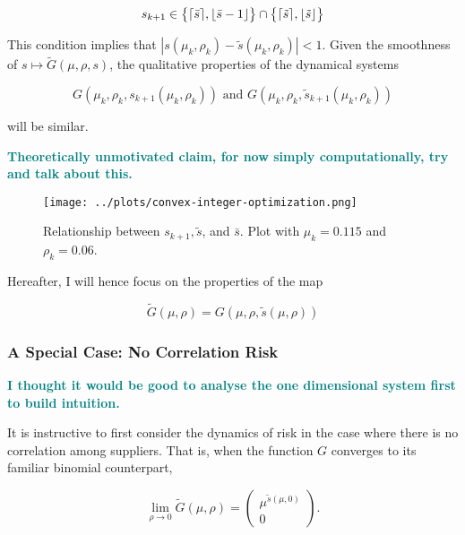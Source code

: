 \documentclass[american, abstract=on]{scrartcl}
\theoremstyle{plain}
\newcommand{\abs}[1]{\left\lvert#1\right\rvert}
\DeclarePairedDelimiter\ceil{\lceil}{\rceil}
\DeclarePairedDelimiter\floor{\lfloor}{\rfloor}
\newcommand\notes[1]{\textcolor{teal}{\footnotesize \textbf{#1}}}
\begin{document}
\begin{equation}
  s_{k + 1} \in \big\{ \ceil{\bar{s}}, \floor{\bar{s} - 1} \big\} \cap \big\{ \ceil{\tilde{s}}, \floor{\tilde{s}} \big\}
\end{equation}

This condition implies that $\abs{s(\mu_k, \rho_k) - \tilde{s}(\mu_k, \rho_k)} < 1$. Given the smoothness of $s \mapsto \tilde{G}(\mu, \rho, s)$, the qualitative properties of the dynamical systems

\begin{equation*}
    G(\mu_k, \rho_k, s_{k + 1}(\mu_k, \rho_k)) \text{ and } G(\mu_k, \rho_k, \tilde{s}_{k + 1}(\mu_k, \rho_k))
\end{equation*}

will be similar.

\notes{Theoretically unmotivated claim, for now simply computationally, try and talk about this.}

\begin{figure}[H]
  \centering
  \texttt{[image: ../plots/convex-integer-optimization.png]}
  \caption{Relationship between $s_{k + 1}, \tilde{s}$, and $\bar{s}$. Plot with $\mu_k = 0.115$ and $\rho_k = 0.06$.}
  \label{fig:convex-integer-optimization}
\end{figure}

Hereafter, I will hence focus on the properties of the map

\begin{equation}
  \tilde{G}(\mu, \rho) = G(\mu, \rho, \tilde{s}(\mu, \rho))
\end{equation}

\subsubsection{A Special Case: No Correlation Risk}

\notes{I thought it would be good to analyse the one dimensional system first to build intuition.}

It is instructive to first consider the dynamics of risk in the case where there is no correlation among suppliers. That is, when the function $G$ converges to its familiar binomial counterpart,

\begin{equation}
   \lim_{\rho \rightarrow 0} \tilde{G}(\mu, \rho) = \begin{pmatrix} \mu^{\tilde{s}(\mu, 0)} \\ 0 \end{pmatrix}.
\end{equation}
\end{document}
